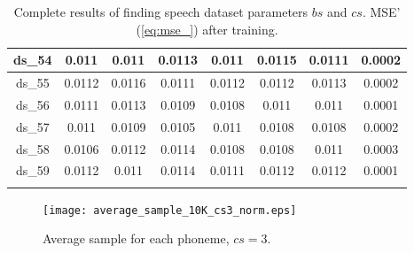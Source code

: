 \begin{longtable}{|c|c|c|c|c|c|c|c|}
ds\_54	& 0.011	& 0.011	& 0.0113	& 0.011	& 0.0115	& 0.0111	& 0.0002	\\ \hline
ds\_55	& 0.0112	& 0.0116	& 0.0111	& 0.0112	& 0.0112	& 0.0113	& 0.0002	\\ \hline
ds\_56	& 0.0111	& 0.0113	& 0.0109	& 0.0108	& 0.011	& 0.011	& 0.0001	\\ \hline
ds\_57	& 0.011	& 0.0109	& 0.0105	& 0.011	& 0.0108	& 0.0108	& 0.0002	\\ \hline
ds\_58	& 0.0106	& 0.0112	& 0.0114	& 0.0108	& 0.0108	& 0.011	& 0.0003	\\ \hline
ds\_59	& 0.0112	& 0.011	& 0.0114	& 0.0111	& 0.0112	& 0.0112	& 0.0001	\\ \hline
\caption{Complete results of finding speech dataset parameters $ bs $ and $ cs $. MSE' (\cref{eq:mse_}) after training.} \label{tab:app:speech_bs_cs_complete_results} \\
\end{longtable}

\begin{figure}[H]
\centering
\texttt{[image: average\_sample\_10K\_cs3\_norm.eps]}
\caption{Average sample for each phoneme, $ cs = 3 $.}
\label{fig:app:speech_average_sample_cs3}
\end{figure}